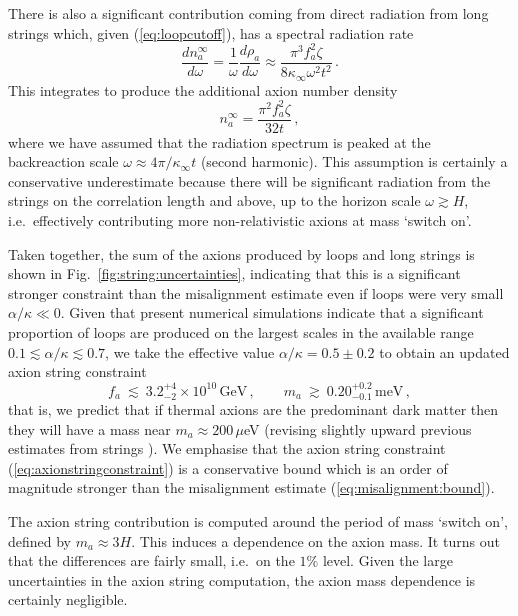\documentclass[preprint,nofootinbib]{revtex4}
\newcommand{\reffig}[1]{Fig.~\ref{#1}}
\newcommand{\units}[1]{\, \mathrm{#1}}
\begin{document}
There is also a significant contribution coming from direct radiation from long strings which, given (\ref{eq:loopcutoff}), has a spectral radiation rate \cite{Battye:1997jk,Battye:1995hw} 
\begin{equation}
\frac{dn_a^\infty}{d\omega} =\frac {1}{\omega} \frac{d\rho_a}{d\omega}  \approx \frac{\pi^3 f_a^2\zeta}{8\kappa_\infty\omega^2 t^2}\,.\label{eq:loopradpower}
\end{equation}
This integrates to produce the additional axion number density
\begin{equation}
n_a^\infty=\frac{ \pi^2 f_a^2 \zeta}{32 t} \,, \label{eq:longaxiondensity}
\end{equation}
where we have assumed that the radiation spectrum is peaked at the backreaction scale $\omega \approx 4\pi/\kappa_\infty t$ (second harmonic). This assumption is certainly a conservative underestimate because there will be significant radiation from the strings on the correlation length and above, up to the horizon scale $\omega \gtrsim H$, i.e.\ effectively contributing more non-relativistic axions at mass `switch on'.

Taken together, the sum of the axions produced by loops and long strings is shown in \reffig{fig:string:uncertainties}, indicating that this is a significant stronger constraint than the misalignment estimate even if loops were very small $\alpha/\kappa \ll 0$. Given that present numerical simulations indicate that a significant proportion of loops are produced on the largest scales in the available range $0.1 \lesssim \alpha/\kappa \lesssim 0.7$, we take the effective value $\alpha/\kappa = 0.5\pm0.2$ to obtain an updated axion string constraint
\begin{equation}
 f_a~\lesssim~3.2^{+4}_{-2}\times10^{10} \units{GeV} \, ,\qquad m_a ~\gtrsim~ 0.20 ^{+0.2}_{-0.1} \units{meV}\,,\label{eq:axionstringconstraint}
\end{equation}
that is, we predict that if thermal axions are the predominant dark matter then they will have a mass near
$m_a \approx 200\,\mu$eV (revising slightly upward previous estimates from strings \cite{Battye:1997jk}). We emphasise that the axion string constraint (\ref{eq:axionstringconstraint}) is a conservative bound which is an order of magnitude stronger than the misalignment estimate (\ref{eq:misalignment:bound}).

The axion string contribution is computed around the period of mass `switch on', defined by $m_a \approx 3H$. This induces a dependence on the axion mass. It turns out that the differences are fairly small, i.e.\ on the $1\%$ level. Given the large uncertainties in the axion string computation, the axion mass dependence is certainly negligible.
\end{document}
